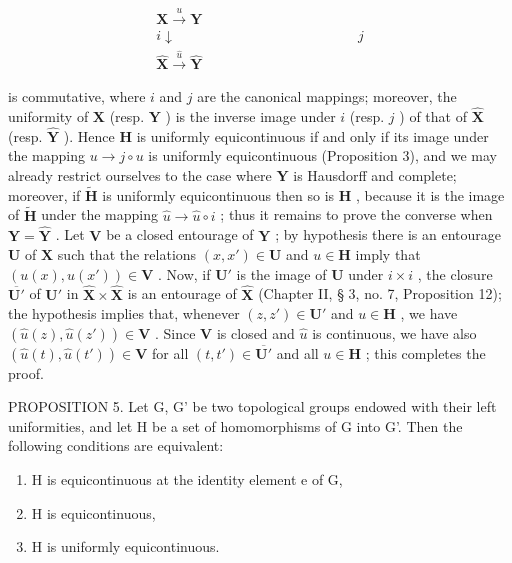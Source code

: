 \[
\begin{array}{c} \mathbf {X} \xrightarrow {u} \mathbf {Y} \\ i \downarrow \quad \quad \quad \quad \quad \quad \quad \quad \quad \quad \quad \quad \quad j \\ \hat {\mathbf {X}} \xrightarrow {\hat {u}} \hat {\mathbf {Y}} \end{array}\tag{1}
\]

is commutative, where \(i\) and \(j\) are the canonical mappings; moreover, the uniformity of \(\mathbf{X}\) (resp. \(\mathbf{Y}\) ) is the inverse image under \(i\) (resp. \(j\) ) of that of \(\hat{\mathbf{X}}\) (resp. \(\hat{\mathbf{Y}}\) ). Hence \(\mathbf{H}\) is uniformly equicontinuous if and only if its image under the mapping \(u \to j \circ u\) is uniformly equicontinuous (Proposition 3), and we may already restrict ourselves to the case where \(\mathbf{Y}\) is Hausdorff and complete; moreover, if \(\tilde{\mathbf{H}}\) is uniformly equicontinuous then so is \(\mathbf{H}\) , because it is the image of \(\tilde{\mathbf{H}}\) under the mapping \(\hat{u} \to \hat{u} \circ i\) ; thus it remains to prove the converse when \(\mathbf{Y} = \hat{\mathbf{Y}}\) . Let \(\mathbf{V}\) be a closed entourage of \(\mathbf{Y}\) ; by hypothesis there is an entourage \(\mathbf{U}\) of \(\mathbf{X}\) such that the relations \((x, x') \in \mathbf{U}\) and \(u \in \mathbf{H}\) imply that \((u(x), u(x')) \in \mathbf{V}\) . Now, if \(\mathbf{U}'\) is the image of \(\mathbf{U}\) under \(i \times i\) , the closure \(\overline{\mathbf{U}'}\) of \(\mathbf{U}'\) in \(\hat{\mathbf{X}} \times \hat{\mathbf{X}}\) is an entourage of \(\hat{\mathbf{X}}\) (Chapter II, § 3, no. 7, Proposition 12); the hypothesis implies that, whenever \((z, z') \in \mathbf{U}'\) and \(u \in \mathbf{H}\) , we have \((\hat{u}(z), \hat{u}(z')) \in \mathbf{V}\) . Since \(\mathbf{V}\) is closed and \(\hat{u}\) is continuous, we have also \((\hat{u}(t), \hat{u}(t')) \in \mathbf{V}\) for all \((t, t') \in \overline{\mathbf{U}'}\) and all \(u \in \mathbf{H}\) ; this completes the proof.

PROPOSITION 5. Let G, G' be two topological groups endowed with their left uniformities, and let H be a set of homomorphisms of G into G'. Then the following conditions are equivalent:

\begin{enumerate}
\def\labelenumi{\alph{enumi})}
\item
  H is equicontinuous at the identity element e of G,
\item
  H is equicontinuous,
\item
  H is uniformly equicontinuous.
\end{enumerate}

